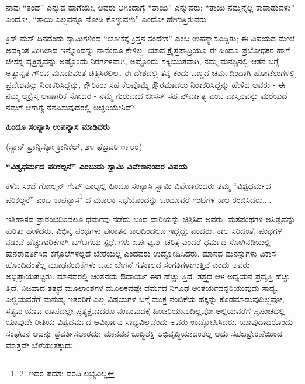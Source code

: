 ನಾವು “ತಂದೆ” ಎನ್ನುವ ಹಾಗೆಯೇ, ಅವರು ಆಗಿಂದಾಗ್ಯೆ “ತಾಯಿ” ಎನ್ನುವರು; “ತಾಯಿ ನಮ್ಮನ್ನೆಲ್ಲ ಕಾಪಾಡುವಳು” ಎಂದೋ, “ತಾಯಿ ಎಲ್ಲವನ್ನೂ ನೋಡಿ ಕೊಳ್ಳುವಳು” ಎಂದೋ ಹೇಳುತ್ತಿರುವರು.

ಕ್ರಿಸ್ ಮಸ್ ದಿನದಂದು ಸ್ವಾಮಿಗಳಿಂದ “ಲೋಕಕ್ಕೆ ಕ್ರಿಸ್ತನ ಸಂದೇಶ” ಎಂಬ ಉಪನ್ಯಾಸವಿದ್ದಿತು; ಈ ವಿಷಯದ ಮೇಲೆ ಅದಕ್ಕಿಂತ ಮಿಗಿಲಾದ ಇನ್ನೊಂದನ್ನು ನಾನೆಂದೂ ಕೇಳಿಲ್ಲ. ಯಾವ ಕ್ರೈಸ್ತಪಾದ್ರಿಯೂ ಈ ಹಿಂದೂ ಪ್ರಬೋಧಕರ ಹಾಗೆ ಜೀಸಸ್ನ ವ್ಯಕ್ತಿತ್ವವನ್ನು ಅಷ್ಟೊಂದು ನಿರರ್ಗಳವಾಗಿ, ಅಷ್ಟೊಂದು ಶಕ್ಯಿಯುತವಾಗಿ, ನಮ್ಮ ಮನಸ್ಸಿನಲ್ಲಿ ಆತನ ಬಗ್ಗೆ ಅತ್ಯುನ್ನತ ಗೌರವ ಮೂಡುವಂತೆ ಚಿತ್ರಿಸಿರಲಿಲ್ಲ. ಈ ದೇಶದಲ್ಲಿ ತನ್ನ ಕಂದು ಬಣ್ಣದ ಚರ್ಮದಿಂದಾಗಿ ಹೋಟೆಲುಗಳಲ್ಲಿ ಪ್ರವೇಶವನ್ನು ನಿರಾಕರಿಸಿದ್ದನ್ನು, ಕ್ಷೌರಿಕರು ಸಹ ಕೆಲವೊಮ್ಮೆ ಕ್ಷೌರಮಾಡಲು ನಿರಾಕರಿಸಿದ್ದನ್ನು ಹೇಳಿದ ಅವರು - ಈ ನಮ್ಮ ಅಕ್ರೈಸ್ತ ಅನಾಗರಿಕ ಸೋದರ - ನಮ್ಮ ಗುರುವಾದ ಜೀಸಸ್ ಸಹ ಪೌರ್ವಾತ್ಯ ಎಂಬ ವಾಸ್ತವವನ್ನು ಮರೆಯದೆ ನಮಗೆ ಆಗಾಗ್ಯೆ ನೆನಪಿಸುವುದರಲ್ಲಿ ಅಚ್ಚರಿಯೇನಿದೆ?

\begin{center}
\textbf{ಹಿಂದೂ ಸಂನ್ಯಾಸಿ ಉಪನ್ಯಾಸ ಮಾಡಿದರು}
\end{center}

\begin{center}
(ಸ್ಯಾನ್ ಫ್ರಾನ್ಸಿಸ್ಕೋ ಕ್ರಾನಿಕಲ್, ೨೪ ಫೆಬ್ರವರಿ ೧೯೦೦)
\end{center}

\begin{center}
\textbf{“ವಿಶ್ವಧರ್ಮದ ಪರಿಕಲ್ಪನೆ” ಎಂಬುದು ಸ್ವಾಮಿ ವಿವೇಕಾನಂದರ ವಿಷಯ}
\end{center}

ಕಳೆದ ಸಂಜೆ ಗೋಲ್ಡನ್ ಗೇಟ್ ಹಾಲ್ನಲ್ಲಿ ಹಿಂದೂ ಸಂನ್ಯಾಸಿ ಸ್ವಾಮಿ ವಿವೇಕಾನಂದರು ತಮ್ಮ “ವಿಶ್ವಧರ್ಮದ ಪರಿಕಲ್ಪನೆ” ಎಂಬ ಉಪನ್ಯಾಸ\footnote{2. ಇದರ ಪದಶಃ ವರದಿ ಲಭ್ಯವಿಲ್ಲ} ದ ಮೂಲಕ ಸಭೆಯೊಂದನ್ನು ಒಂದೂವರೆ ಗಂಟೆಗಳ ಕಾಲ ರಂಜಿಸಿದರು....

ಇತಿಹಾಸದ ಪ್ರಾರಂಭದಿಂದಲೂ ಧರ್ಮವು ನಡೆದು ಬಂದ ದಾರಿಯನ್ನು ಚಿತ್ರಿಸಿದ ಅವರು, ಮತಪಂಥಗಳ ಅಸ್ತಿತ್ವವನ್ನು ಕುರಿತು ಹೇಳಿದರು. ವಿಭಿನ್ನ ಪಂಥಗಳು ಪುರಾತನ ಕಾಲದಿಂದಲೂ ಇದ್ದದ್ದೇ ಎಂದರು. ಕಾಲ ಸರಿದಂತೆ, ಪಂಥಗಳ ನಡುವೆ ಹೆಚ್ಚುಗಾರಿಕೆಗಾಗಿ ಬಗೆಬಗೆಯ ಸ್ಪರ್ಧೆಗಳು ಏರ್ಪಟ್ಟವು. ಚರಿತ್ರೆ ಎಂದರೆ ಧರ್ಮದ ಸೋಗಿನಡಿಯಲ್ಲಿ ಪುನರಾವರ್ತಿಸಿದ ಕಗ್ಗೊಲೆಗಳಲ್ಲದೆ ಬೇರೆಯಲ್ಲ ಎಂದವರು ಉದ್ಘೋಷಿಸಿದರು. ಮಾನವ ಮನಸ್ಸುಗಳು ವಿಕಾಸ ಹೊಂದಿದಂತೆಲ್ಲ ಮೂಢನಂಬಿಕೆಗಳು ಬಹು ಬೇಗನೆ ಗತಕಾಲದ ಸಂಗತಿಗಳಾಗುತ್ತಿವೆ ಎಂದು ಅವರು ಅಭಿಪ್ರಾಯಪಟ್ಟರು. ಮಾನವರಲ್ಲಿ ಚಿಂತನೆಯ ಔದಾರ್ಯ ಈಗ ಹೆಚ್ಚು ತ್ತಿದೆ. ತತ್ತ್ವದ ಆಳ ಅಧ್ಯಯನ ಪ್ರವೃತ್ತಿ ಹೆಚ್ಚು ತ್ತಿದೆ; ನಿಜವಾದ ತತ್ತ್ವದ ಮೂಲಾಂಶಗಳ ಮೂಲಕವಷ್ಟೇ ಧರ್ಮದ ನಿಗೂಢ ಆಂತರ್ಯವನ್ನರಿಯುವುದು ಸಾಧ್ಯ. ಎಲ್ಲಿಯವರೆಗೆ ಮನುಷ್ಯ ಇತರರಿಗೆ ಎಲ್ಲ ವಿಷಯಗಳ ಬಗ್ಗೆ ಮುಕ್ತ ನಂಬಿಕೆಯ ಹಕ್ಕನ್ನು ಕೊಡಮಾಡುವುದಿಲ್ಲವೋ, ಸತ್ಯವು ಯಾವ ರೂಪದಲ್ಲೇ ಪ್ರತ್ಯಕ್ಷವಾದರೂ ನಂಬುವುದಕ್ಕೆ ಹಿಂಜರಿಯುವುದಿಲ್ಲವೋ ಅಲ್ಲಿಯವರೆಗೆ ಪ್ರಪಂಚದಲ್ಲಿ ಯಾವುದೇ ರೀತಿಯ ವಿಶ್ವಧರ್ಮದ ಆವಿರ್ಭಾವ ಸಾಧ್ಯವಿಲ್ಲವೆಂದು ಅವರು ಉದ್ಘೋಷಿಸಿದರು. ಯಾವುದಾದರೊಂದು ಸಂಘಟನೆ ಅದನ್ನು ಪ್ರವರ್ತಿಸಲಾರದು; ಮಾನವನ ಬುದ್ಧಿಶಕ್ತಿ ಅಭಿವೃದ್ಧಿಯಾದಂತೆಲ್ಲ ಅದು ಸಹಜಪ್ರೇರಣೆಯಿಂದ ಮಾತ್ರವೇ ಬೆಳೆಯುತಕ್ಕುದು.

